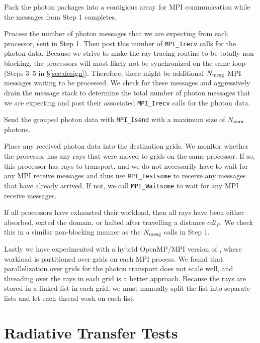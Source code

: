 \documentclass[12pt,preprint]{aastex}
\begin{document}
 Pack the photon packages into a contigious array for MPI
communication while the messages from Step 1 completes.

 Process the number of photon messages that we are expecting
from each processor, sent in Step 1.  Then post this number of
\texttt{MPI\_Irecv} calls for the photon data.  Because we strive to
make the ray tracing routine to be totally non-blocking, the
processors will most likely not be synchronized on the same loop
(Steps 3--5 in \S\ref{sec:design}).  Therefore, there might be
additional $N_{\rm mesg}$ MPI messages waiting to be processed.  We
check for these messages and aggressively drain the message stack to
determine the total number of photon messages that we are expecting
and post their associated \texttt{MPI\_Irecv} calls for the photon
data.

 Send the grouped photon data with \texttt{MPI\_Isend} with a
maximum size of $N_{\rm max}$ photons.

 Place any received photon data into the destination grids.
We monitor whether the processor has any rays that were moved to grids
on the same processor.  If so, this processor has rays to transport,
and we do not necessarily have to wait for any MPI receive messages
and thus use \texttt{MPI\_Testsome} to receive any messages that have
already arrived.  If not, we call \texttt{MPI\_Waitsome} to wait for
any MPI receive messages.

 If all processors have exhausted their workload, then all
rays have been either absorbed, exited the domain, or halted after
travelling a distance $cdt_P$.  We check this in a similar
non-blocking manner as the $N_{\rm mesg}$ calls in Step 1.

Lastly we have experimented with a hybrid OpenMP/MPI version of \enzo,
where workload is partitioned over grids on each MPI process.  We
found that parallelization over grids for the photon transport does
not scale well, and threading over the rays in each grid is a better
approach.  Because the rays are stored in a linked list in each grid,
we must manually split the list into separate lists and let each
thread work on each list.

\section{Radiative Transfer Tests}
\label{sec:rt_tests}
\end{document}
